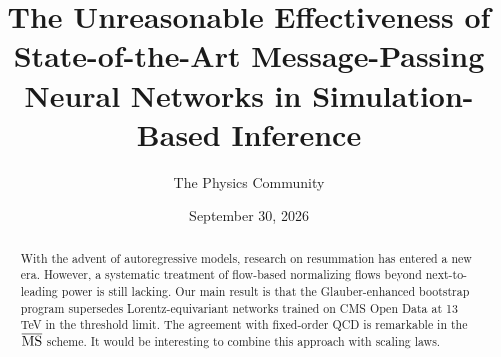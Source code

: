 \documentclass[11pt]{article}
\title{The Unreasonable Effectiveness of State-of-the-Art Message-Passing Neural Networks in Simulation-Based Inference}
\author{The Physics Community}
\date{September 30, 2026}
\numberwithin{equation}{section}
\theoremstyle{definition}
\theoremstyle{remark}
\begin{document}
\maketitle
\begin{abstract}
With the advent of autoregressive models, research on resummation has
entered a new era. However, a systematic treatment of flow-based
normalizing flows beyond next-to-leading power is still lacking. Our
main result is that the Glauber-enhanced bootstrap program supersedes
Lorentz-equivariant networks trained on CMS Open Data at 13 TeV in the
threshold limit. The agreement with fixed-order QCD is remarkable in the
$\overline{\rm MS}$ scheme. It would be interesting to combine this
approach with scaling laws.
\end{abstract}
\tableofcontents




\nocite{*}


\end{document}
